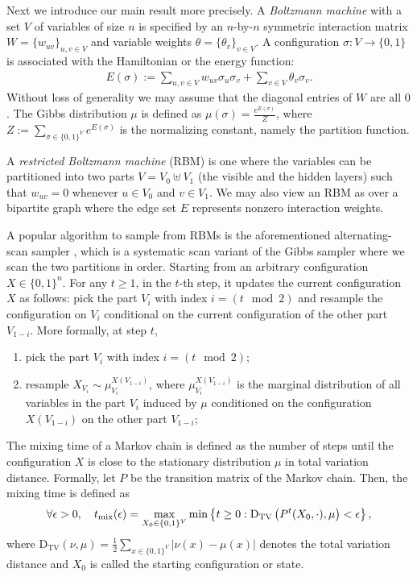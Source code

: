 \documentclass[11pt]{amsart}
\def\-#1{\mathrm{#1}}
\newcommand{\abs}[1]{\ensuremath{\left\vert#1\right\vert}}
\newcommand{\defeq}{:=}
\newcommand{\DTV}[2]{\-D_{\mathrm{TV}}\left({#1},{#2}\right)}
\theoremstyle{definition}
\theoremstyle{remark}
\begin{document}
Next we introduce our main result more precisely.
A \emph{Boltzmann machine} \cite{AHS85} with a set $V$ of variables of size $n$
is specified by an $n$-by-$n$ symmetric interaction matrix $W=\{w_{uv}\}_{u,v\in V}$ and variable weights $\theta=\{\theta_v\}_{v\in V}$.
A configuration $\sigma:V\rightarrow \{0,1\}$ is associated with the Hamiltonian or the energy function:
\begin{align}\label{eqn:BM-Hamiltonian}
  E(\sigma) \defeq \sum_{u,v \in V} w_{uv} \sigma_u\sigma_v + \sum_{v\in V}\theta_v \sigma_v.
\end{align}
Without loss of generality we may assume that the diagonal entries of $W$ are all $0$.
The Gibbs distribution $\mu$ is defined as $\mu(\sigma) = \frac{e^{E(\sigma)}}{Z}$,
where $Z\defeq\sum_{\sigma\in\{0,1\}^V} e^{E(\sigma)}$ is the normalizing constant, namely the partition function.

A \emph{restricted Boltzmann machine} (RBM) \cite{Smo86} is one where the variables can be partitioned into two parts $V=V_0\uplus V_1$ (the visible and the hidden layers) such that $w_{uv}=0$ whenever $u\in V_0$ and $v\in V_1$.
We may also view an RBM as over a bipartite graph where the edge set $E$ represents nonzero interaction weights.

A popular algorithm to sample from RBMs is the aforementioned alternating-scan sampler \cite{Hin12},
which is a systematic scan variant of the Gibbs sampler where we scan the two partitions in order.
Starting from an arbitrary configuration $X \in \{0,1\}^n$.
For any $t \geq 1$, in the $t$-th step, 
it updates the current configuration $X$ as follows: 
pick the part $V_i$ with index $i = (t \mod 2)$ and resample the configuration on $V_i$ conditional on the current configuration of the other part $V_{1-i}$.
More formally, at step $t$, 
\begin{enumerate}
    \item pick the part $V_i$ with index $i = (t \mod 2)$;
    \item resample $X_{V_i} \sim \mu_{V_i}^{X(V_{1-i})}$, where $\mu_{V_i}^{X(V_{1-i})}$ is the marginal distribution of all variables in the part $V_i$ induced by $\mu$ conditioned on the configuration $X(V_{1-i})$ on the other part $V_{1-i}$;
\end{enumerate}
The mixing time of a Markov chain is defined as the number of steps until the configuration $X$ is close to the stationary distribution $\mu$ in total variation distance. 
Formally, let $P$ be the transition matrix of the Markov chain. 
Then, the mixing time is defined as
\begin{align}\label{eq:mixing-time}
    \forall \epsilon > 0, \quad t_{\textnormal{mix}}(\epsilon) = \max_{X_0 \in \{0,1\}^V}\min\left\{t \geq 0: \DTV{{P}^t(X_0,\cdot)}{\mu} < \epsilon\right\},
\end{align}
where $\DTV{\nu}{\mu}= \frac{1}{2}\sum_{x \in \{0,1\}^V} \abs{\nu(x) - \mu(x)}$ denotes the total variation distance and $X_0$ is called the starting configuration or state.
\end{document}
